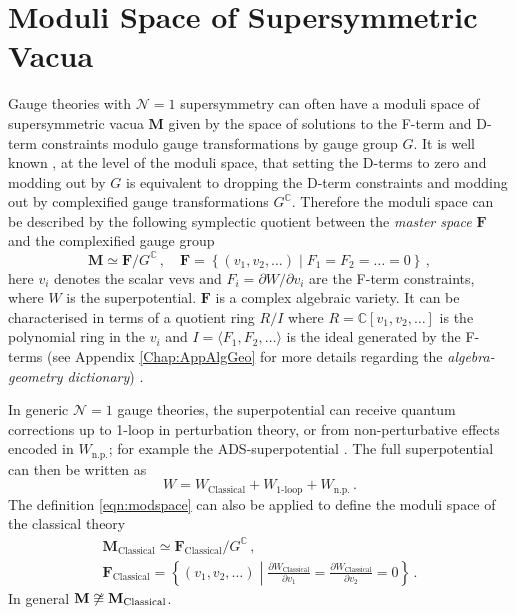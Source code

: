 \documentclass[main.tex]{subfiles}
\begin{document}
\section{Moduli Space of Supersymmetric Vacua}
\label{sec:modulispace}
Gauge theories with $\mathcal{N}=1$ supersymmetry can often have a moduli space of supersymmetric vacua $\mathbf{M}$ given by the space of solutions to the F-term and D-term constraints modulo gauge transformations by gauge group $G$. It is well known \cite{Luty:1995sd}, at the level of the moduli space, that setting the D-terms to zero and modding out by $G$ is equivalent to dropping the D-term constraints and modding out by complexified gauge transformations $G^{\mathbb{C}}$. Therefore the moduli space can be described by the following symplectic quotient between the \textit{master space} $\mathbf{F}$ and the complexified gauge group
\begin{equation}\label{eqn:modspace}
\mathbf{M} \simeq \mathbf{F}/G^{\mathbb{C}}\,,\quad \mathbf{F}=\left\{(v_1,v_2,\dots)\middle|F_1=F_2=\dots=0\right\}\,,
\end{equation}
here $v_i$ denotes the scalar vevs and $F_i=\partial W/\partial v_i$ are the F-term constraints, where $W$ is the superpotential. $\mathbf{F}$ is a complex algebraic variety. It can be characterised in terms of a quotient ring $R/I$ where $R=\mathbb{C}[v_1,v_2,\dots]$ is the polynomial ring in the $v_i$ and $I=\langle F_1,F_2,\dots\rangle$ is the ideal generated by the F-terms (see Appendix \ref{Chap:AppAlgGeo} for more details regarding the \textit{algebra-geometry dictionary}) .   

In generic $\mathcal{N}=1$ gauge theories, the superpotential can receive quantum corrections up to 1-loop in perturbation theory, or from non-perturbative effects encoded in $W_{\text{n.p.}}$; for example the ADS-superpotential \cite{Affleck:1983mk}. The full superpotential can then be written as
\begin{equation}
W=W_{\text{Classical}}+W_{\text{1-loop}}+W_{\text{n.p.}}\,.
\end{equation}
The definition \eqref{eqn:modspace} can also be applied to define the moduli space of the classical theory 
\begin{gather}\label{eqn:modspaceclassical}
\mathbf{M}_{\text{Classical}} \simeq \mathbf{F}_{\text{Classical}}/G^{\mathbb{C}}\,,\\ \mathbf{F}_{\text{Classical}}=\left\{(v_1,v_2,\dots)\middle|\frac{\partial W_{\text{Classical}}}{\partial v_1}=\frac{\partial W_{\text{Classical}}}{\partial v_2}=0\right\}\,.
\end{gather}
In general $\mathbf{M}\not\cong\mathbf{M}_{\text{Classical}}$.
\end{document}
